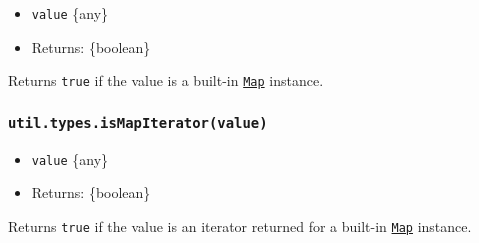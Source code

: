 \begin{itemize}
\tightlist
\item
  \texttt{value} \{any\}
\item
  Returns: \{boolean\}
\end{itemize}

Returns \texttt{true} if the value is a built-in
\href{https://developer.mozilla.org/en-US/docs/Web/JavaScript/Reference/Global_Objects/Map}{\texttt{Map}}
instance.

\begin{Shaded}
\begin{Highlighting}[]
\NormalTok{(} \NormalTok{())}\OperatorTok{;}  
\end{Highlighting}
\end{Shaded}

\subsubsection{\texorpdfstring{\texttt{util.types.isMapIterator(value)}}{util.types.isMapIterator(value)}}\label{util.types.ismapiteratorvalue}

\begin{itemize}
\tightlist
\item
  \texttt{value} \{any\}
\item
  Returns: \{boolean\}
\end{itemize}

Returns \texttt{true} if the value is an iterator returned for a
built-in
\href{https://developer.mozilla.org/en-US/docs/Web/JavaScript/Reference/Global_Objects/Map}{\texttt{Map}}
instance.

\begin{Shaded}
\begin{Highlighting}[]
\OperatorTok{=}  \NormalTok{()}\OperatorTok{;}
\NormalTok{())}\OperatorTok{;}  
\NormalTok{())}\OperatorTok{;}  
\NormalTok{())}\OperatorTok{;}  
\NormalTok{(map[}\NormalTok{]())}\OperatorTok{;}  
\end{Highlighting}
\end{Shaded}

